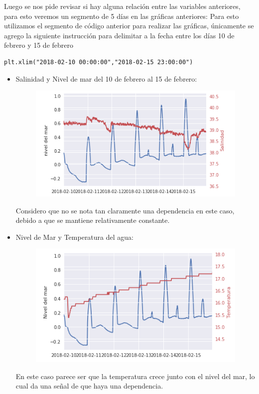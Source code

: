\documentclass{article}
\begin{document}
Luego se nos pide revisar si hay alguna relación entre las variables anteriores, para esto veremos un segmento de 5 días en las gráficas anteriores:
Para esto utilizamos el segmento de código anterior para realizar las gráficas, únicamente se agrego la siguiente instrucción para delimitar a la fecha entre los días 10 de febrero y 15 de febrero
\begin{verbatim}
plt.xlim("2018-02-10 00:00:00","2018-02-15 23:00:00")
\end{verbatim}

\begin{itemize}
\item Salinidad y Nivel de mar del 10 de febrero al 15 de febrero:
\begin{figure}[h!]
\centering
\includegraphics[width=0.4\linewidth]{nivel-sal-5dias.png}
\end{figure}
Considero que no se nota tan claramente una dependencia en este caso, debido a que se mantiene relativamente constante.

\item Nivel de Mar y Temperatura del agua:
\begin{figure}[h!]
\centering
\includegraphics[width=0.4\linewidth]{nivel-temp-5dias.png}
\end{figure}
En este caso parece ser que la temperatura crece junto con el nivel del mar, lo cual da una señal de que haya una dependencia.

\end{itemize}
\end{document}
